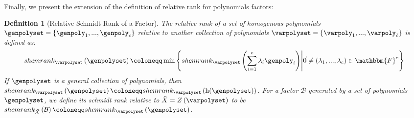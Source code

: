 \documentclass[10pt,a4paper]{article}
\newtheorem{definition}[theorem]{Definition}
\newcommand{\definedas}[0]{\coloneqq}
\newcommand{\parens}[1]{\left( #1 \right)}
\newcommand{\set}[1]{\left\{ #1 \right\}}
\newcommand{\suchthat}[0]{\middle|}
\newcommand{\basefield}[0]{\mathbbm{F}}
\newcommand{\factor}[0]{\mathcal{B}}
\newcommand{\variety}{{\tilde{X}}}
\newcommand{\varietypolycount}{{\tilde{c}}}
\newcommand{\homopart}[1]{\mathrm{h}({#1})}
\newcommand{\zerofunc}[1]{Z \parens{#1}}
\newcommand{\relschmrank}[2]{shcmrank_{#1}\parens{{#2}}}
\begin{document}

Finally, we present the extension of the definition of relative rank for polynomials factors:
\begin{definition}[Relative Schmidt Rank of a Factor]
    The relative rank of a set of homogenous polynomials $\genpolyset = \set{\genpoly_1,...,\genpoly_c}$
    relative to another collection of polynomials $\varpolyset = \set{\varpoly_1,...,\varpoly_\varietypolycount}$ is defined as:
    \[
        \relschmrank{\varpolyset}{\genpolyset} \definedas
        \min \set{\relschmrank{\varpolyset}{\sum_{i=1}^c{\lambda_i \genpoly_i}} \suchthat \vec{0} \neq (\lambda_1,...,\lambda_c) \in \basefield^c}
    \]
    If $\genpolyset$ is a general collection of polynomials, then $\relschmrank{\varpolyset}{\genpolyset} \definedas \relschmrank{\varpolyset}{\homopart{\genpolyset}}$.
    \newline
    For a factor $\factor$ generated by a set of polynomials $\genpolyset$, we define its schmidt rank relative to $\variety = \zerofunc{\varpolyset}$
    to be $\relschmrank{\variety}{\factor} \definedas \relschmrank{\varpolyset}{\genpolyset}$.
\end{definition}
\end{document}
